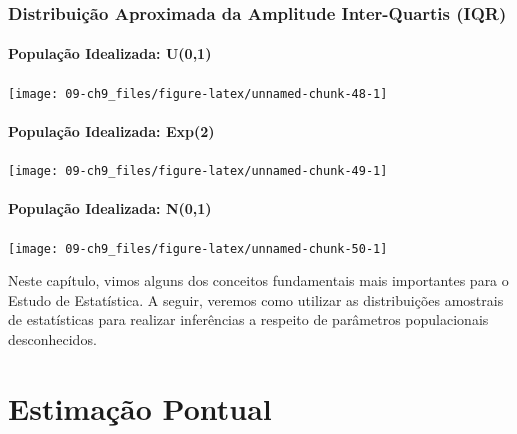 \documentclass[
]{book}
\theoremstyle{definition}
\theoremstyle{definition}
\theoremstyle{definition}
\theoremstyle{remark}
\begin{document}
\hypertarget{distribuiuxe7uxe3o-aproximada-da-amplitude-inter-quartis-iqr}{%
\subsection*{Distribuição Aproximada da Amplitude Inter-Quartis (IQR)}\label{distribuiuxe7uxe3o-aproximada-da-amplitude-inter-quartis-iqr}}

\hypertarget{populauxe7uxe3o-idealizada-u01-4}{%
\subsubsection*{População Idealizada: U(0,1)}\label{populauxe7uxe3o-idealizada-u01-4}}

\texttt{[image: 09-ch9\_files/figure-latex/unnamed-chunk-48-1]}

\hypertarget{populauxe7uxe3o-idealizada-exp2-4}{%
\subsubsection*{População Idealizada: Exp(2)}\label{populauxe7uxe3o-idealizada-exp2-4}}

\texttt{[image: 09-ch9\_files/figure-latex/unnamed-chunk-49-1]}

\hypertarget{populauxe7uxe3o-idealizada-n01-4}{%
\subsubsection*{População Idealizada: N(0,1)}\label{populauxe7uxe3o-idealizada-n01-4}}

\texttt{[image: 09-ch9\_files/figure-latex/unnamed-chunk-50-1]}

Neste capítulo, vimos alguns dos conceitos fundamentais mais importantes para o Estudo de Estatística. A seguir, veremos como utilizar as distribuições amostrais de estatísticas para realizar inferências a respeito de parâmetros populacionais desconhecidos.

\hypertarget{estimauxe7uxe3o-pontual}{%
\chapter{Estimação Pontual}\label{estimauxe7uxe3o-pontual}}
\end{document}

